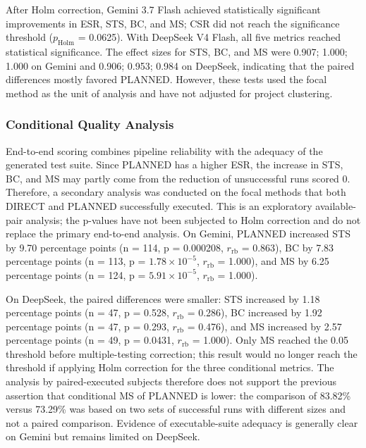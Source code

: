 \documentclass[pdflatex,sn-basic,Numbered,iicol]{sn-jnl}
\begin{document}
After Holm correction, Gemini 3.7 Flash achieved statistically significant improvements in ESR, STS, BC, and MS; CSR did not reach the significance threshold ($p_{\mathrm{Holm}}$ = 0.0625). With DeepSeek V4 Flash, all five metrics reached statistical significance. The effect sizes for STS, BC, and MS were 0.907; 1.000; 1.000 on Gemini and 0.906; 0.953; 0.984 on DeepSeek, indicating that the paired differences mostly favored PLANNED. However, these tests used the focal method as the unit of analysis and have not adjusted for project clustering.

\subsubsection{Conditional Quality Analysis}\label{subsubsec:rq1-conditional}

End-to-end scoring combines pipeline reliability with the adequacy of the generated test suite. Since PLANNED has a higher ESR, the increase in STS, BC, and MS may partly come from the reduction of unsuccessful runs scored 0. Therefore, a secondary analysis was conducted on the focal methods that both DIRECT and PLANNED successfully executed. This is an exploratory available-pair analysis; the p-values have not been subjected to Holm correction and do not replace the primary end-to-end analysis. On Gemini, PLANNED increased STS by 9.70 percentage points (n = 114, p = 0.000208, $r_{\mathrm{rb}}$ = 0.863), BC by 7.83 percentage points (n = 113, p = $1.78\times 10^{-5}$, $r_{\mathrm{rb}}$ = 1.000), and MS by 6.25 percentage points (n = 124, p = $5.91\times 10^{-5}$, $r_{\mathrm{rb}}$ = 1.000).

On DeepSeek, the paired differences were smaller: STS increased by 1.18 percentage points (n = 47, p = 0.528, $r_{\mathrm{rb}}$ = 0.286), BC increased by 1.92 percentage points (n = 47, p = 0.293, $r_{\mathrm{rb}}$ = 0.476), and MS increased by 2.57 percentage points (n = 49, p = 0.0431, $r_{\mathrm{rb}}$ = 1.000). Only MS reached the 0.05 threshold before multiple-testing correction; this result would no longer reach the threshold if applying Holm correction for the three conditional metrics. The analysis by paired-executed subjects therefore does not support the previous assertion that conditional MS of PLANNED is lower: the comparison of 83.82\% versus 73.29\% was based on two sets of successful runs with different sizes and not a paired comparison. Evidence of executable-suite adequacy is generally clear on Gemini but remains limited on DeepSeek.
\end{document}
